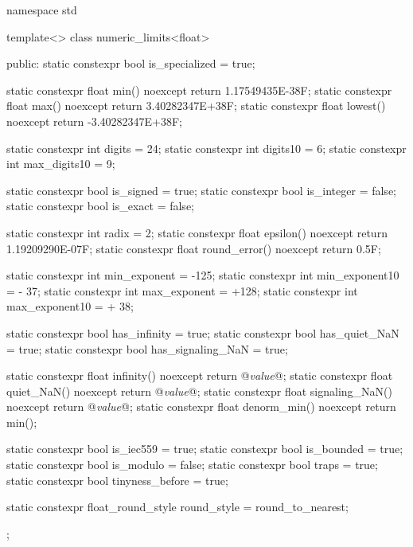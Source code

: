\pnum
\begin{example}
\begin{codeblock}
namespace std {
  template<> class numeric_limits<float> {
  public:
    static constexpr bool is_specialized = true;

    static constexpr float min() noexcept { return 1.17549435E-38F; }
    static constexpr float max() noexcept { return 3.40282347E+38F; }
    static constexpr float lowest() noexcept { return -3.40282347E+38F; }

    static constexpr int digits   = 24;
    static constexpr int digits10 =  6;
    static constexpr int max_digits10 =  9;

    static constexpr bool is_signed  = true;
    static constexpr bool is_integer = false;
    static constexpr bool is_exact   = false;

    static constexpr int radix = 2;
    static constexpr float epsilon() noexcept     { return 1.19209290E-07F; }
    static constexpr float round_error() noexcept { return 0.5F; }

    static constexpr int min_exponent   = -125;
    static constexpr int min_exponent10 = - 37;
    static constexpr int max_exponent   = +128;
    static constexpr int max_exponent10 = + 38;

    static constexpr bool has_infinity      = true;
    static constexpr bool has_quiet_NaN     = true;
    static constexpr bool has_signaling_NaN = true;

    static constexpr float infinity()      noexcept { return @\textit{value}@; }
    static constexpr float quiet_NaN()     noexcept { return @\textit{value}@; }
    static constexpr float signaling_NaN() noexcept { return @\textit{value}@; }
    static constexpr float denorm_min()    noexcept { return min(); }

    static constexpr bool is_iec559  = true;
    static constexpr bool is_bounded = true;
    static constexpr bool is_modulo  = false;
    static constexpr bool traps      = true;
    static constexpr bool tinyness_before = true;

    static constexpr float_round_style round_style = round_to_nearest;
  };
}
\end{codeblock}
\end{example}

